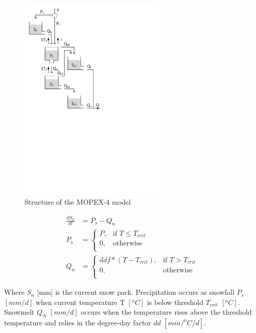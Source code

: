 { 																	%
\begin{figure}
\includegraphics[trim=1cm 13cm 7cm 1cm,width=7cm,keepaspectratio]{./AppA_files/32_schematic.pdf}
\caption{Structure of the MOPEX-4 model} \label{fig:32_schematic}
\end{figure}

\begin{align}
	\frac{dS_n}{dt} &= P_s-Q_{n} \\
	P_s &= \begin{cases}
		P, &\text{if } T \leq T_{crit} \\
		0, & \text{otherwise} \\
	\end{cases} \\
	Q_n &=\begin{cases}
		ddf*(T-T_{crit}), &\text{if } T > T_{crit} \\
		0, & \text{otherwise} \\
	\end{cases}
\end{align}

Where $S_n$ [mm] is the current snow pack. Precipitation occurs as snowfall $P_s$ $[mm/d]$ when current temperature T $[^oC]$ is below threshold $T_{crit}$ $[^oC]$. Snowmelt $Q_N$ $[mm/d]$ occurs when the temperature rises above the threshold temperature and relies in the degree-day factor $dd$ $[mm/^oC/d]$.

} %
\vspace{5cm}

